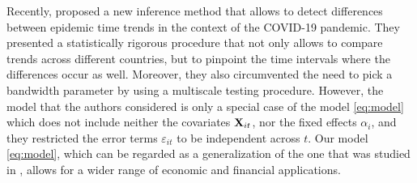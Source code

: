 \documentclass[a4paper,12pt]{article}
\begin{document}
Recently, \cite{KhismatullinaVogt2021} proposed a new inference method that allows to detect differences between epidemic time trends in the context of the COVID-19 pandemic. They presented a statistically rigorous procedure that not only allows to compare trends across different countries, but to pinpoint the time intervals where the differences occur as well. Moreover, they also circumvented the need to pick a bandwidth parameter by using a multiscale testing procedure. However, the model that the authors considered is only a special case of the model \eqref{eq:model} which does not include neither the covariates $\mathbf{X}_{it}$, nor the fixed effects $\alpha_i$, and they restricted the error terms $\varepsilon_{it}$ to be independent across $t$. Our model \eqref{eq:model}, which can be regarded as a generalization of the one that was studied in \cite{KhismatullinaVogt2021}, allows for a wider range of economic and financial applications.


\end{document}
